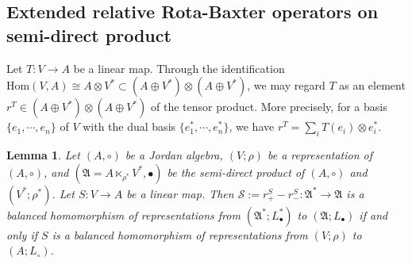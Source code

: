\documentclass[12pt, reqno, a4paper]{amsart}
\newtheorem{lemma}[theorem]{Lemma}
\theoremstyle{definition}
\newcommand{\Hom}{\mathrm{Hom}}
\begin{document}
\subsection{Extended relative Rota-Baxter operators on semi-direct product}

Let $T: V \to A$ be a linear map.
Through the identification $\Hom(V, A) \cong A \otimes V^* \subset (A \oplus V^*) \otimes (A \oplus V^*)$, we may regard $T$ as an element $r^{T} \in (A \oplus V^*) \otimes (A \oplus V^*)$ of the tensor product.
More precisely, for a basis $\{e_1, \cdots, e_n\}$ of $V$ with the dual basis $\{e_1^*, \cdots, e_n^*\}$, we have $r^T = \sum_{i} T(e_i) \otimes e_i^*$.

\begin{lemma}\label{lem:b2bsm}
	Let $(A, \circ)$ be a Jordan algebra, $(V; \rho)$ be a representation of $(A, \circ)$, and $(\mathfrak{A}=A \ltimes_{\rho^*} V^*, \bullet)$ be the semi-direct product of $(A, \circ)$ and $(V^*; \rho^*)$.
	Let $S: V \to A$ be a linear map.
	Then $\mathcal{S} := r^{S}_{+} - r^{S}_{-}: \mathfrak{A}^* \to \mathfrak{A}$ is a balanced homomorphism of representations from $(\mathfrak{A}^*; L_{\bullet}^*)$ to $(\mathfrak{A}; L_{\bullet})$ if and only if $S$ is a balanced homomorphism of representations from $(V; \rho)$ to $(A; L_{\circ})$.
\end{lemma}
\end{document}
